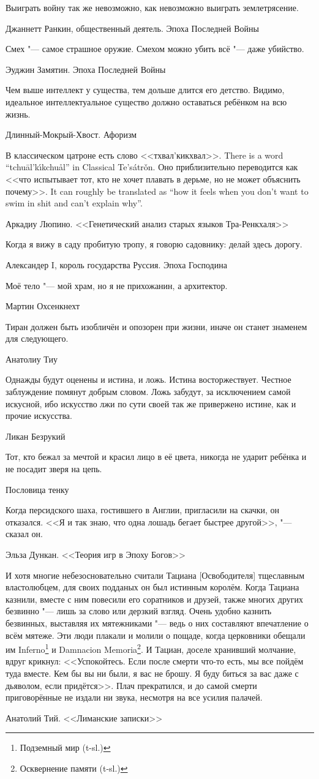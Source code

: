 \epigraph
{Выиграть войну так же невозможно, как невозможно выиграть землетрясение.}
{Джаннетт Ранкин, общественный деятель.
Эпоха Последней Войны}

\epigraph
{Смех "--- самое страшное оружие.
Смехом можно убить всё "--- даже убийство.}
{Эуджин Замятин.
Эпоха Последней Войны}

\epigraph
{Чем выше интеллект у существа, тем дольше длится его детство.
Видимо, идеальное интеллектуальное существо должно оставаться ребёнком на всю жизнь.}
{Длинный-Мокрый-Хвост.
Афоризм}

\epigraph{
{В классическом цатроне есть слово <<тхвал'кикхвал>>.}
{There is a word ``tchu\={a}l'k\'{\i}kchu\r{a}l'' in Classical Te's\'{a}tr\v{o}n.}
{Оно приблизительно переводится как <<что испытывает тот, кто не хочет плавать в дерьме, но не может объяснить почему>>.}
{It can roughly be translated as ``how it feels when you don't want to swim in shit and can't explain why''.}
}{
Аркадиу Люпино.
<<Генетический анализ старых языков Тра-Ренкхаля>>
}

\epigraph
{Когда я вижу в саду пробитую тропу, я говорю садовнику: делай здесь дорогу.}
{Александер I, король государства Руссия.
Эпоха Господина}

\epigraph
{Моё тело "--- мой храм, но я не прихожанин, а архитектор.}
{Мартин Охсенкнехт}

\epigraph
{Тиран должен быть изобличён и опозорен при жизни, иначе он станет знаменем для следующего.}
{Анатолиу Тиу}

\epigraph
{Однажды будут оценены и истина, и ложь.
Истина восторжествует.
Честное заблуждение помянут добрым словом.
Ложь забудут, за исключением самой искусной, ибо искусство лжи по сути своей так же привержено истине, как и прочие искусства.}
{Ликан Безрукий}

\epigraph
{Тот, кто бежал за мечтой и красил лицо в её цвета, никогда не ударит ребёнка и не посадит зверя на цепь.}
{Пословица тенку}

\epigraph
{Когда персидского шаха, гостившего в Англии, пригласили на скачки, он отказался.
<<Я и так знаю, что одна лошадь бегает быстрее другой>>, "--- сказал он.}
{Эльза Дункан.
<<Теория игр в Эпоху Богов>>}

\epigraph
{\ldotst И хотя многие небезосновательно считали Тациана [Освободителя] тщеславным властолюбцем, для своих подданых он был истинным королём.
Когда Тациана казнили, вместе с ним повесили его соратников и друзей, также многих других безвинно "--- лишь за слово или дерзкий взгляд.
Очень удобно казнить безвинных, выставляя их мятежниками "--- ведь о них составляют впечатление о всём мятеже.
Эти люди плакали и молили о пощаде, когда церковники обещали им Inferno\footnote{Подземный мир (t-sl.)} и Damnacion Memoria\footnote{Осквернение памяти (t-sl.)}.
И Тациан, доселе хранивший молчание, вдруг крикнул: <<Успокойтесь.
Если после смерти что-то есть, мы все пойдём туда вместе.
Кем бы вы ни были, я вас не брошу.
Я буду биться за вас даже с дьяволом, если придётся>>.
Плач прекратился, и до самой смерти приговорённые не издали ни звука, несмотря на все усилия палачей.}
{Анатолий Тий.
<<Лиманские записки>>}

